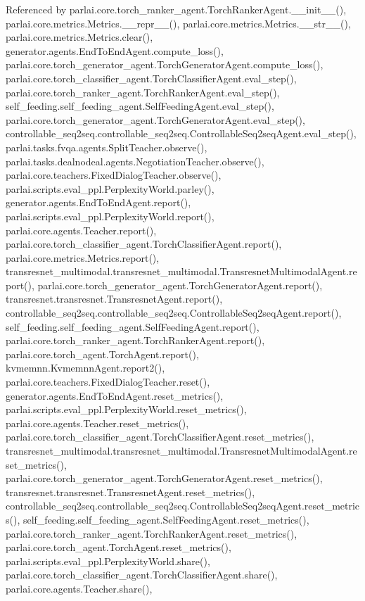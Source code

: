 Referenced by parlai.\+core.\+torch\+\_\+ranker\+\_\+agent.\+Torch\+Ranker\+Agent.\+\_\+\+\_\+init\+\_\+\+\_\+(), parlai.\+core.\+metrics.\+Metrics.\+\_\+\+\_\+repr\+\_\+\+\_\+(), parlai.\+core.\+metrics.\+Metrics.\+\_\+\+\_\+str\+\_\+\+\_\+(), parlai.\+core.\+metrics.\+Metrics.\+clear(), generator.\+agents.\+End\+To\+End\+Agent.\+compute\+\_\+loss(), parlai.\+core.\+torch\+\_\+generator\+\_\+agent.\+Torch\+Generator\+Agent.\+compute\+\_\+loss(), parlai.\+core.\+torch\+\_\+classifier\+\_\+agent.\+Torch\+Classifier\+Agent.\+eval\+\_\+step(), parlai.\+core.\+torch\+\_\+ranker\+\_\+agent.\+Torch\+Ranker\+Agent.\+eval\+\_\+step(), self\+\_\+feeding.\+self\+\_\+feeding\+\_\+agent.\+Self\+Feeding\+Agent.\+eval\+\_\+step(), parlai.\+core.\+torch\+\_\+generator\+\_\+agent.\+Torch\+Generator\+Agent.\+eval\+\_\+step(), controllable\+\_\+seq2seq.\+controllable\+\_\+seq2seq.\+Controllable\+Seq2seq\+Agent.\+eval\+\_\+step(), parlai.\+tasks.\+fvqa.\+agents.\+Split\+Teacher.\+observe(), parlai.\+tasks.\+dealnodeal.\+agents.\+Negotiation\+Teacher.\+observe(), parlai.\+core.\+teachers.\+Fixed\+Dialog\+Teacher.\+observe(), parlai.\+scripts.\+eval\+\_\+ppl.\+Perplexity\+World.\+parley(), generator.\+agents.\+End\+To\+End\+Agent.\+report(), parlai.\+scripts.\+eval\+\_\+ppl.\+Perplexity\+World.\+report(), parlai.\+core.\+agents.\+Teacher.\+report(), parlai.\+core.\+torch\+\_\+classifier\+\_\+agent.\+Torch\+Classifier\+Agent.\+report(), parlai.\+core.\+metrics.\+Metrics.\+report(), transresnet\+\_\+multimodal.\+transresnet\+\_\+multimodal.\+Transresnet\+Multimodal\+Agent.\+report(), parlai.\+core.\+torch\+\_\+generator\+\_\+agent.\+Torch\+Generator\+Agent.\+report(), transresnet.\+transresnet.\+Transresnet\+Agent.\+report(), controllable\+\_\+seq2seq.\+controllable\+\_\+seq2seq.\+Controllable\+Seq2seq\+Agent.\+report(), self\+\_\+feeding.\+self\+\_\+feeding\+\_\+agent.\+Self\+Feeding\+Agent.\+report(), parlai.\+core.\+torch\+\_\+ranker\+\_\+agent.\+Torch\+Ranker\+Agent.\+report(), parlai.\+core.\+torch\+\_\+agent.\+Torch\+Agent.\+report(), kvmemnn.\+Kvmemnn\+Agent.\+report2(), parlai.\+core.\+teachers.\+Fixed\+Dialog\+Teacher.\+reset(), generator.\+agents.\+End\+To\+End\+Agent.\+reset\+\_\+metrics(), parlai.\+scripts.\+eval\+\_\+ppl.\+Perplexity\+World.\+reset\+\_\+metrics(), parlai.\+core.\+agents.\+Teacher.\+reset\+\_\+metrics(), parlai.\+core.\+torch\+\_\+classifier\+\_\+agent.\+Torch\+Classifier\+Agent.\+reset\+\_\+metrics(), transresnet\+\_\+multimodal.\+transresnet\+\_\+multimodal.\+Transresnet\+Multimodal\+Agent.\+reset\+\_\+metrics(), parlai.\+core.\+torch\+\_\+generator\+\_\+agent.\+Torch\+Generator\+Agent.\+reset\+\_\+metrics(), transresnet.\+transresnet.\+Transresnet\+Agent.\+reset\+\_\+metrics(), controllable\+\_\+seq2seq.\+controllable\+\_\+seq2seq.\+Controllable\+Seq2seq\+Agent.\+reset\+\_\+metrics(), self\+\_\+feeding.\+self\+\_\+feeding\+\_\+agent.\+Self\+Feeding\+Agent.\+reset\+\_\+metrics(), parlai.\+core.\+torch\+\_\+ranker\+\_\+agent.\+Torch\+Ranker\+Agent.\+reset\+\_\+metrics(), parlai.\+core.\+torch\+\_\+agent.\+Torch\+Agent.\+reset\+\_\+metrics(), parlai.\+scripts.\+eval\+\_\+ppl.\+Perplexity\+World.\+share(), parlai.\+core.\+torch\+\_\+classifier\+\_\+agent.\+Torch\+Classifier\+Agent.\+share(), parlai.\+core.\+agents.\+Teacher.\+share(), 